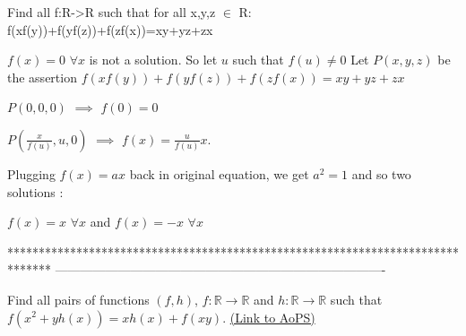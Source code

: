 \begin{solution}
	\begin{tcolorbox}Find all f:R->R such that for all x,y,z $\in$ R:
f(xf(y))+f(yf(z))+f(zf(x))=xy+yz+zx\end{tcolorbox}
$f(x)=0$ $\forall x$ is not a solution. So let $u$ such that $f(u)\ne 0$
Let $P(x,y,z)$ be the assertion $f(xf(y))+f(yf(z))+f(zf(x))=xy+yz+zx$

$P(0,0,0)$ $\implies$ $f(0)=0$

$P(\frac x{f(u)},u,0)$ $\implies$ $f(x)=\frac u{f(u)}x$.

Plugging $f(x)=ax$ back in original equation, we get $a^2=1$ and so two solutions :

$\boxed{f(x)=x}$ $\forall x$ and $\boxed{f(x)=-x}$ $\forall x$
\end{solution}
*******************************************************************************
-------------------------------------------------------------------------------

\begin{problem}
	Find all pairs of functions $(f,h)$, $f: \mathbb{R}\to\mathbb{R}$ and $h: \mathbb{R}\to\mathbb{R}$ such that $f(x^2+yh(x))=xh(x)+f(xy)$.
	\flushright \href{https://artofproblemsolving.com/community/c6h573000}{(Link to AoPS)}
\end{problem}



